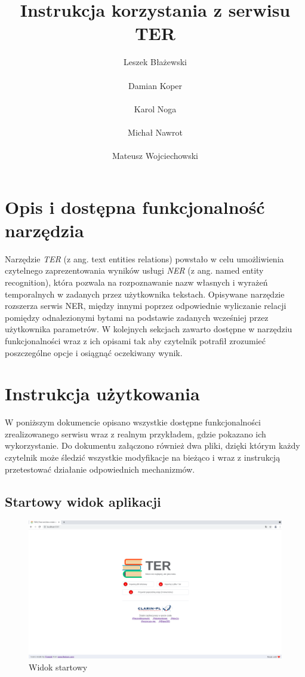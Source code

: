 \documentclass[12pt, a4paper]{article}
\title{ Instrukcja korzystania z serwisu TER}
\author{ Leszek Błażewski\\\\Damian Koper\\\\Karol Noga\\\\Michał Nawrot\\\\Mateusz Wojciechowski}
\begin{document}
\maketitle
\pagebreak

\tableofcontents
\pagebreak


\section{Opis i dostępna funkcjonalność narzędzia}

Narzędzie \textit{TER} (z ang. text entities relations) powstało w celu umożliwienia czytelnego zaprezentowania wyników usługi \textit{NER} (z ang. named entity recognition), która pozwala na rozpoznawanie nazw własnych i wyrażeń temporalnych w zadanych przez użytkownika tekstach. Opisywane narzędzie rozszerza serwis NER, między innymi poprzez odpowiednie wyliczanie relacji pomiędzy odnalezionymi bytami na podstawie zadanych wcześniej przez użytkownika parametrów. W kolejnych sekcjach zawarto dostępne w narzędziu funkcjonalności wraz z ich opisami tak aby czytelnik potrafił zrozumieć poszczególne opcje i osiągnąć oczekiwany wynik.

\section{Instrukcja użytkowania}

W poniższym dokumencie opisano wszystkie dostępne funkcjonalności zrealizowanego serwisu wraz z realnym przykładem, gdzie pokazano ich wykorzystanie. Do dokumentu załączono również dwa pliki, dzięki którym każdy czytelnik może śledzić wszystkie modyfikacje na bieżąco i wraz z instrukcją przetestować działanie odpowiednich mechanizmów.

\pagebreak

\subsection{Startowy widok aplikacji}

\begin{figure}[H]
    \centering
    \includegraphics[width=\linewidth]{images/homepage.png}
    \caption{Widok startowy}
\end{figure}
\end{document}

